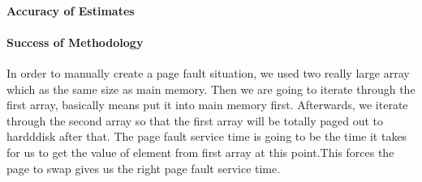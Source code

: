 \paragraph{Accuracy of Estimates}
\paragraph{Success of Methodology}

In order to manually create a page fault situation, we used two really large array which as the same size as main memory. Then we are going to iterate through the first array, basically means put it into main memory first. Afterwards, we iterate through the second array so that the first array will be totally paged out to hardddisk after that. The page fault service time is going to be the time it takes for us to get the value of element from first array at this point.This forces the page to swap gives us the right page fault service time. 
